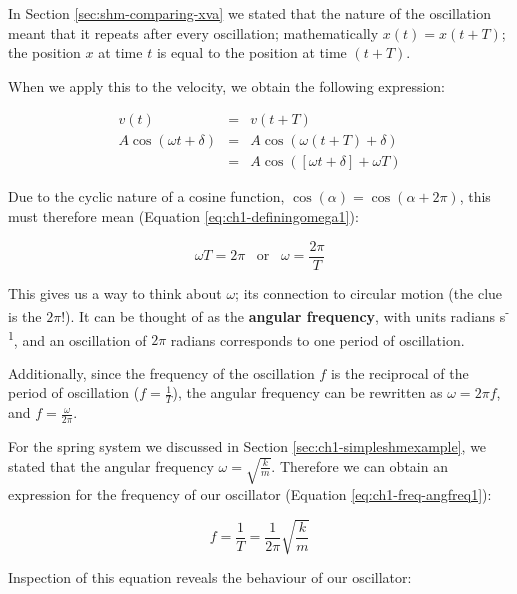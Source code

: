 \documentclass[
]{book}
\begin{document}
In Section \ref{sec:shm-comparing-xva} we stated that the nature of the oscillation meant that it repeats after every oscillation; mathematically \(x(t) = x(t + T)\); the position \(x\) at time \(t\) is equal to the position at time \((t+T)\).

When we apply this to the velocity, we obtain the following expression:

\begin{equation}
\begin{array}{rcl}
v(t) &=& v(t+T) \\
A \cos (\omega t + \delta) &=& A \cos (\omega (t+T) + \delta) \\
&=& A \cos ([\omega t + \delta] + \omega T)
\end{array}
\end{equation}

Due to the cyclic nature of a cosine function, \(\cos (\alpha) = \cos (\alpha + 2\pi)\), this must therefore mean (Equation \eqref{eq:ch1-definingomega1}):

\begin{equation}
\omega T = 2\pi \hspace{10pt} \textrm{or} \hspace{10pt} \omega = \frac{2\pi}{T}
\label{eq:ch1-definingomega1}
\end{equation}

This gives us a way to think about \(\omega\); its connection to circular motion (the clue is the \(2\pi\)!). It can be thought of as the \textbf{angular frequency}, with units radians s\textsuperscript{-1}, and an oscillation of \(2\pi\) radians corresponds to one period of oscillation.

Additionally, since the frequency of the oscillation \(f\) is the reciprocal of the period of oscillation (\(f = \frac{1}{T}\)), the angular frequency can be rewritten as \(\omega = 2\pi f\), and \(f = \frac{\omega}{2\pi}\).

For the spring system we discussed in Section \ref{sec:ch1-simpleshmexample}, we stated that the angular frequency \(\omega = \sqrt{\frac{k}{m}}\). Therefore we can obtain an expression for the frequency of our oscillator (Equation \eqref{eq:ch1-freq-angfreq1}):

\begin{equation}
f = \frac{1}{T} = \frac{1}{2\pi}\sqrt{\frac{k}{m}}
\label{eq:ch1-freq-angfreq1}
\end{equation}

Inspection of this equation reveals the behaviour of our oscillator:
\end{document}
